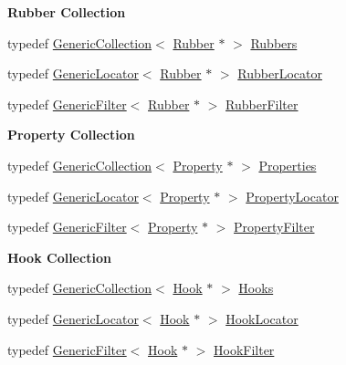 \begin{Indent}\textbf{ Rubber Collection}\par
\begin{DoxyCompactItemize}
\item 
typedef \hyperlink{classHurricane_1_1GenericCollection}{Generic\+Collection}$<$ \hyperlink{classHurricane_1_1Rubber}{Rubber} $\ast$ $>$ \hyperlink{namespaceHurricane_af8923abd57508cc44931a00d61b564ad}{Rubbers}
\item 
typedef \hyperlink{classHurricane_1_1GenericLocator}{Generic\+Locator}$<$ \hyperlink{classHurricane_1_1Rubber}{Rubber} $\ast$ $>$ \hyperlink{namespaceHurricane_ae4f27278e942109c3c47ad1b741f9df3}{Rubber\+Locator}
\item 
typedef \hyperlink{classHurricane_1_1GenericFilter}{Generic\+Filter}$<$ \hyperlink{classHurricane_1_1Rubber}{Rubber} $\ast$ $>$ \hyperlink{namespaceHurricane_ae331d428a7e324593e4a47dac023b7f0}{Rubber\+Filter}
\end{DoxyCompactItemize}
\end{Indent}
\begin{Indent}\textbf{ Property Collection}\par
\begin{DoxyCompactItemize}
\item 
typedef \hyperlink{classHurricane_1_1GenericCollection}{Generic\+Collection}$<$ \hyperlink{classHurricane_1_1Property}{Property} $\ast$ $>$ \hyperlink{namespaceHurricane_afd7bca6dad4be54b7c03b0463e6c0004}{Properties}
\item 
typedef \hyperlink{classHurricane_1_1GenericLocator}{Generic\+Locator}$<$ \hyperlink{classHurricane_1_1Property}{Property} $\ast$ $>$ \hyperlink{namespaceHurricane_a91d71616b5784225dfd4296487e49c07}{Property\+Locator}
\item 
typedef \hyperlink{classHurricane_1_1GenericFilter}{Generic\+Filter}$<$ \hyperlink{classHurricane_1_1Property}{Property} $\ast$ $>$ \hyperlink{namespaceHurricane_a9e98e66d188d506145a5e92045691777}{Property\+Filter}
\end{DoxyCompactItemize}
\end{Indent}
\begin{Indent}\textbf{ Hook Collection}\par
\begin{DoxyCompactItemize}
\item 
typedef \hyperlink{classHurricane_1_1GenericCollection}{Generic\+Collection}$<$ \hyperlink{classHurricane_1_1Hook}{Hook} $\ast$ $>$ \hyperlink{namespaceHurricane_a9dcd9b74dc5e2b51bec7a13c25807e02}{Hooks}
\item 
typedef \hyperlink{classHurricane_1_1GenericLocator}{Generic\+Locator}$<$ \hyperlink{classHurricane_1_1Hook}{Hook} $\ast$ $>$ \hyperlink{namespaceHurricane_aca3a5babe6265eb9f140112d8e8b79e6}{Hook\+Locator}
\item 
typedef \hyperlink{classHurricane_1_1GenericFilter}{Generic\+Filter}$<$ \hyperlink{classHurricane_1_1Hook}{Hook} $\ast$ $>$ \hyperlink{namespaceHurricane_a9287de05984b91e55592a77e8d394324}{Hook\+Filter}
\end{DoxyCompactItemize}
\end{Indent}
